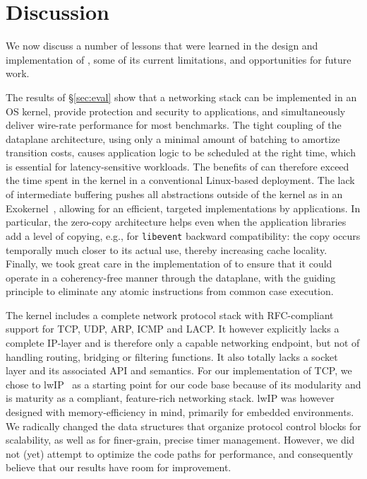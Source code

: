 
\section{Discussion}
\label{sec:disc}

We now discuss a number of lessons that were learned in the design and
implementation of \ix, some of its current limitations, and
opportunities for future work.

 The results of \S\ref{sec:eval}
show that a networking stack can be implemented in an OS kernel,
provide protection and security to applications, and simultaneously
deliver wire-rate performance for most benchmarks.  The tight coupling
of the dataplane architecture, using only a minimal amount of batching
to amortize transition costs, causes application logic to be scheduled
at the right time, which is essential for latency-sensitive workloads.
The benefits of \ix can therefore exceed the time spent in the kernel
in a conventional Linux-based deployment.  The lack of intermediate
buffering pushes all abstractions outside of the kernel as in an
Exokernel~\cite{DBLP:conf/sosp/EnglerKO95}, allowing for an efficient,
targeted implementations by applications.  In particular, the
zero-copy architecture helps even when the application libraries add a
level of copying, e.g., for \texttt{libevent} backward compatibility:
the copy occurs temporally much closer to its actual use, thereby
increasing cache locality.  Finally, we took great care in the
implementation of \ix to ensure that it could operate in a
coherency-free manner through the dataplane, with the guiding
principle to eliminate any atomic instructions from common case
execution.

The \ix kernel includes a complete network protocol stack with
RFC-compliant support for TCP, UDP, ARP, ICMP and LACP.  It however
explicitly lacks a complete IP-layer and is therefore only a capable
networking endpoint, but not of handling routing, bridging or
filtering functions.  It also totally lacks a socket layer and its
associated API and semantics.  For our implementation of TCP, we chose
to lwIP~\cite{dunkels2001design} as a starting point for our code base because of its
modularity and is maturity as a compliant, feature-rich networking
stack.  lwIP was however designed with memory-efficiency in mind,
primarily for embedded environments.  We radically changed the data
structures that organize protocol control blocks for scalability, as
well as for finer-grain, precise timer management.  However, we did
not (yet) attempt to optimize the code paths for performance, and
consequently believe that our results have room for improvement.



